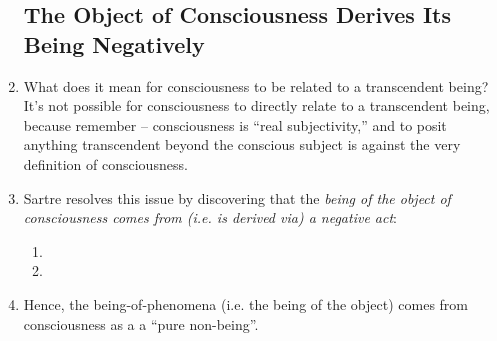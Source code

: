 \begin{enumerate}
  \subsection{The Object of Consciousness Derives Its Being Negatively}
  \item What does it mean for consciousness to be related to a transcendent being? It's not possible for consciousness to directly relate to a transcendent being, because remember -- consciousness is \enquote{real subjectivity,} and to posit anything transcendent beyond the conscious subject is against the very definition of consciousness.
  \item Sartre resolves this issue by discovering that the \emph{being of the object of consciousness comes from (i.e. is derived via) a negative act}:
  \begin{enumerate}
    \item {}
    \item {}
  \end{enumerate}
  \item Hence, the being-of-phenomena (i.e. the being of the object) comes from consciousness as a a \enquote{pure non-being}.


\end{enumerate}
